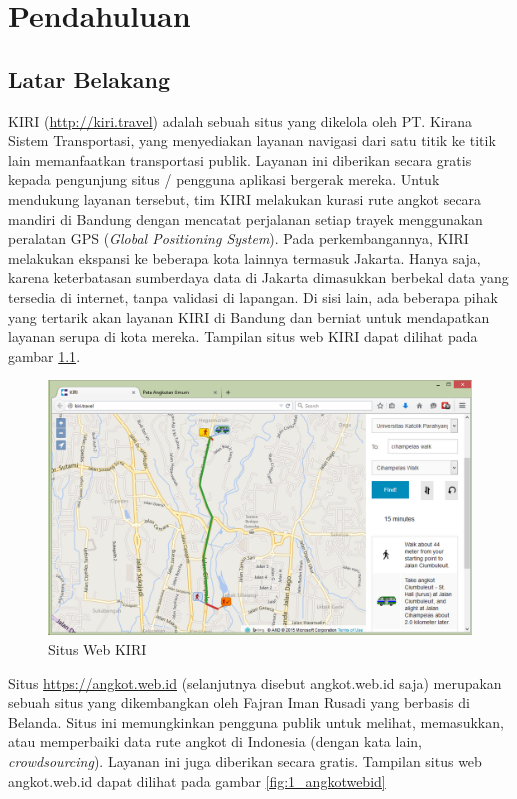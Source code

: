 \chapter{Pendahuluan}
\label{chap:pendahuluan}

\section{Latar Belakang}
\label{sec:latar_belakang}

KIRI (\url{http://kiri.travel}) adalah sebuah situs yang dikelola oleh PT. Kirana Sistem Transportasi, yang menyediakan layanan navigasi dari satu titik ke titik lain memanfaatkan transportasi publik. Layanan ini diberikan secara gratis kepada pengunjung situs / pengguna aplikasi bergerak mereka. Untuk mendukung layanan tersebut, tim KIRI melakukan kurasi rute angkot secara mandiri di Bandung dengan mencatat perjalanan setiap trayek menggunakan peralatan GPS (\textit{Global Positioning System}). Pada perkembangannya, KIRI melakukan ekspansi ke beberapa kota lainnya termasuk Jakarta. Hanya saja, karena keterbatasan sumberdaya data di Jakarta dimasukkan berbekal data yang tersedia di internet, tanpa validasi di lapangan. Di sisi lain, ada beberapa pihak yang tertarik akan layanan KIRI di Bandung dan berniat untuk mendapatkan layanan serupa di kota mereka. Tampilan situs web KIRI dapat dilihat pada gambar \ref{fig:1_kiri}.

\begin{figure}
	\centering
	\includegraphics[scale=0.5]{Gambar/1_kiri}
	\caption{Situs Web KIRI} 
	\label{fig:1_kiri}
\end{figure}

Situs \url{https://angkot.web.id} (selanjutnya disebut angkot.web.id saja) merupakan sebuah situs yang dikembangkan oleh Fajran Iman Rusadi yang berbasis di Belanda. Situs ini memungkinkan pengguna publik untuk melihat, memasukkan, atau memperbaiki data rute angkot di Indonesia (dengan kata lain, \textit{crowdsourcing}). Layanan ini juga diberikan secara gratis. Tampilan situs web angkot.web.id dapat dilihat pada gambar \ref{fig:1_angkotwebid}

